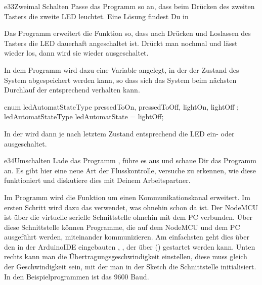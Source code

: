 \begin{excercise}{e33}{Zweimal Schalten}
Passe das Programm  so an, dass beim Drücken des
zweiten Tasters die zweite LED leuchtet. Eine Lösung findest Du in
\end{excercise}

Das Programm  erweitert die Funktion so, 
dass nach Drücken und Loslassen des Tasters die LED dauerhaft angeschaltet ist.
Drückt man nochmal und lässt wieder los, dann wird sie wieder ausgeschaltet.

In dem Programm wird dazu eine Variable angelegt, in der der Zustand des System 
abgespeichert werden kann, so dass sich das System beim nächsten Durchlauf der 
entsprechend verhalten kann.

\begin{src}
enum ledAutomatStateType
{
  pressedToOn,
  pressedToOff,
  lightOn,
  lightOff
};
ledAutomatStateType 
  ledAutomatState 
    = lightOff;
\end{src}

In der  wird dann je nach letztem Zustand entsprechend die LED ein- oder ausgeschaltet.

\begin{excercise}{e34}{Umschalten}
Lade das Programm , führe es aus und schaue Dir das Programm an. 
Es gibt hier eine neue Art der Flusskontrolle, versuche zu erkennen, wie diese funktioniert und
diskutiere dies mit Deinem Arbeitspartner.
\end{excercise}

\vfill\null\pagebreak
{}

Im Programm  wird die Funktion um einen Kommunikationskanal erweitert. Im ersten Schritt
wird dazu das verwendet, was ohnehin schon da ist. Der NodeMCU ist über die virtuelle serielle Schnittstelle
ohnehin mit dem PC verbunden. Über diese Schnittstelle können Programme, die auf dem NodeMCU und dem PC ausgeführt
werden, miteinander kommunizieren. Am einfachsten geht dies über den in der ArduinoIDE eingebauten , 
, der über  () gestartet werden kann.
Unten rechts kann man die Übertragungsgeschwindigkeit einstellen, diese muss gleich der Geschwindigkeit sein,
mit der man in der Sketch die Schnittstelle ini\-tia\-li\-siert. In den Beispielprogrammen ist das 9600 Baud.


